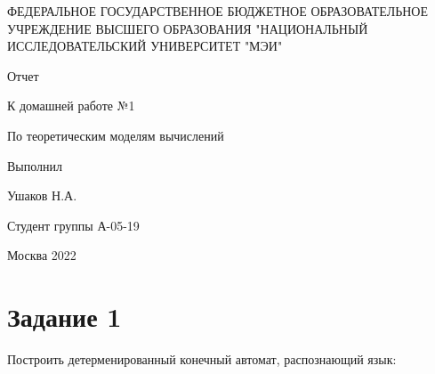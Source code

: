 \documentclass [a4paper, 14pt] {article} %
\begin{document}
\thispagestyle{empty}

\begin{center}
	ФЕДЕРАЛЬНОЕ ГОСУДАРСТВЕННОЕ БЮДЖЕТНОЕ ОБРАЗОВАТЕЛЬНОЕ УЧРЕЖДЕНИЕ ВЫСШЕГО ОБРАЗОВАНИЯ "НАЦИОНАЛЬНЫЙ ИССЛЕДОВАТЕЛЬСКИЙ УНИВЕРСИТЕТ "МЭИ"
\end{center}

\vspace{7cm}

\begin{center}
    \Huge Отчет

	\Large К домашней работе №1
	
	\large По теоретическим моделям вычислений
\end{center}

\vspace{2cm}

\begin{flushright}
	Выполнил
	
	Ушаков Н.А. 
	
	Студент группы А-05-19
\end{flushright}

\vfill
\begin{center}
	Москва 2022
\end{center}

\newpage

\section*{Задание 1} 
Построить детерменированный конечный автомат, распознающий язык:
\end{document}
